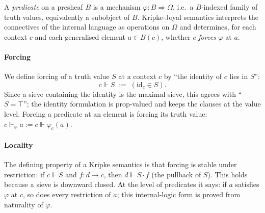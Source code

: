 \documentclass{lmcs}
\newcommand{\Om}{\Omega}
\begin{document}
A \emph{predicate} on a presheaf $B$ is a mechanism $\varphi : B \Rightarrow \Om$, i.e.\ a $B$-indexed family of truth values, equivalently a subobject of $B$.
Kripke-Joyal semantics interprets the connectives of the internal language as operations on $\Om$ and determines, for each context $c$ and each generalised element $a \in B(c)$, whether $c$ \emph{forces} $\varphi$ at $a$.

\paragraph{Forcing}
We define forcing of a truth value $S$ at a context $c$ by ``the identity of $c$ lies in $S$'':
\[ c \Vdash S \;:=\; (\mathrm{id}_c \in S). \]
Since a sieve containing the identity is the maximal sieve, this agrees with ``$S = \top$''; the identity formulation is prop-valued and keeps the clauses at the value level.
Forcing a predicate at an element is forcing its truth value: $c \Vdash_\varphi a := c \Vdash \varphi_c(a)$.

\paragraph{Locality}
The defining property of a Kripke semantics is that forcing is stable under restriction: if $c \Vdash S$ and $f : d \to c$, then $d \Vdash S{\cdot}f$ (the pullback of $S$).
This holds because a sieve is downward closed.
At the level of predicates it says: if $a$ satisfies $\varphi$ at $c$, so does every restriction of $a$; this internal-logic form is proved from naturality of $\varphi$.
\end{document}
